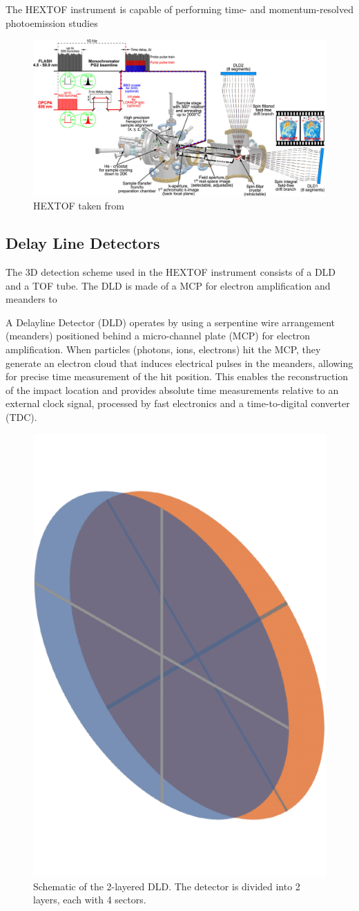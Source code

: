 The \gls{HEXTOF} instrument is capable of performing time- and momentum-resolved photoemission studies 
\begin{figure}
    \centering
    \includegraphics[width=1\linewidth]{images/2024-08-27-10-50-01.png}
    \caption{HEXTOF taken from \cite{kutnyakhovTimeMomentumresolvedPhotoemission2020}}
\end{figure}

\subsection{Delay Line Detectors}
The 3D detection scheme used in the \gls{HEXTOF} instrument consists of a \gls{DLD} and a \gls{TOF} tube. The \gls{DLD} is made of a \gls{MCP} for electron amplification and meanders to 

A Delayline Detector (DLD) operates by using a serpentine wire arrangement (meanders) positioned behind a micro-channel plate (MCP) for electron amplification. When particles (photons, ions, electrons) hit the MCP, they generate an electron cloud that induces electrical pulses in the meanders, allowing for precise time measurement of the hit position. This enables the reconstruction of the impact location and provides absolute time measurements relative to an external clock signal, processed by fast electronics and a time-to-digital converter (TDC).

\begin{figure}
    \centering
    \includegraphics[width=0.3\linewidth]{images/sectors_figure.pdf}
    \caption{Schematic of the 2-layered DLD. The detector is divided into 2 layers, each with 4 sectors.}
    \label{fig:sectors}
\end{figure}

